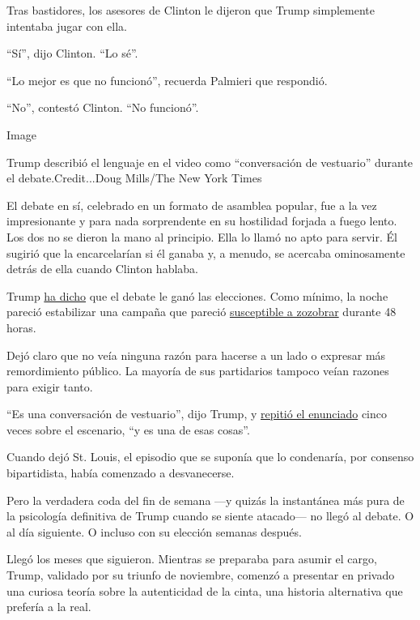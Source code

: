 Tras bastidores, los asesores de Clinton le dijeron que Trump
simplemente intentaba jugar con ella.

``Sí'', dijo Clinton. ``Lo sé''.

``Lo mejor es que no funcionó'', recuerda Palmieri que respondió.

``No'', contestó Clinton. ``No funcionó''.

Image

Trump describió el lenguaje en el video como ``conversación de
vestuario'' durante el debate.Credit...Doug Mills/The New York Times

El debate en sí, celebrado en un formato de asamblea popular, fue a la
vez impresionante y para nada sorprendente en su hostilidad forjada a
fuego lento. Los dos no se dieron la mano al principio. Ella lo llamó no
apto para servir. Él sugirió que la encarcelarían si él ganaba y, a
menudo, se acercaba ominosamente detrás de ella cuando Clinton hablaba.

Trump
\href{https://www.politico.com/magazine/story/2019/07/10/american-carnage-excerpt-access-hollywood-tape-227269}{ha
dicho} que el debate le ganó las elecciones. Como mínimo, la noche
pareció estabilizar una campaña que pareció
\href{https://www.huffpost.com/entry/yahoo-64-hours-october-american-politics_n_59d7c567e4b072637c43dd1c}{susceptible
a zozobrar} durante 48 horas.

Dejó claro que no veía ninguna razón para hacerse a un lado o expresar
más remordimiento público. La mayoría de sus partidarios tampoco veían
razones para exigir tanto.

``Es una conversación de vestuario'', dijo Trump, y
\href{https://www.nytimes.com/2016/10/10/us/politics/transcript-second-debate.html}{repitió
el enunciado} cinco veces sobre el escenario, ``y es una de esas
cosas''.

Cuando dejó St. Louis, el episodio que se suponía que lo condenaría, por
consenso bipartidista, había comenzado a desvanecerse.

Pero la verdadera coda del fin de semana ---y quizás la instantánea más
pura de la psicología definitiva de Trump cuando se siente atacado--- no
llegó al debate. O al día siguiente. O incluso con su elección semanas
después.

Llegó los meses que siguieron. Mientras se preparaba para asumir el
cargo, Trump, validado por su triunfo de noviembre, comenzó a presentar
en privado una curiosa teoría sobre la autenticidad de la cinta, una
historia alternativa que prefería a la real.

